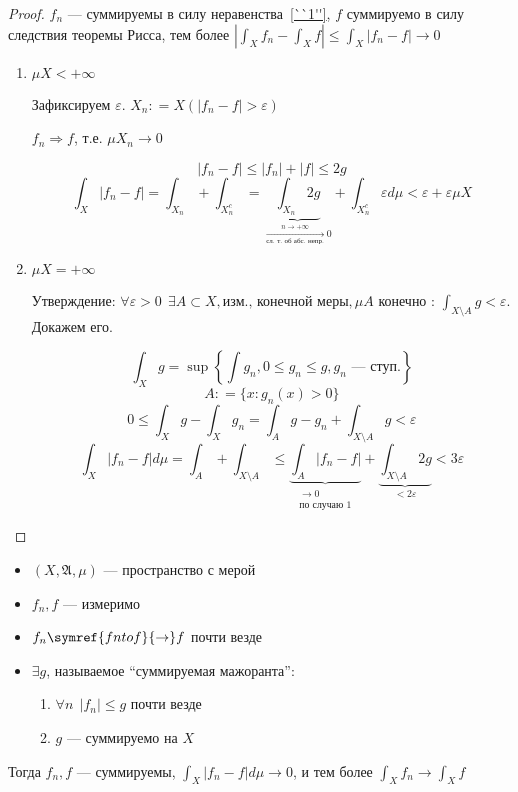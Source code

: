 \begin{proof}
    \(f_n\) --- суммируемы в силу неравенства~\eqref{``1''}, \(f\) суммируемо в силу следствия теоремы Рисса, тем более \(|\int_X f_n - \int_X f| \leq  \int_X |f_n - f| \to 0\)

    \begin{enumerate}
        \item \(\mu X < +\infty\)

              Зафиксируем \(\varepsilon\). \(X_n : = X(|f_n - f| > \varepsilon)\)

              \(f_n \Rightarrow f\), т.е. \(\mu X_n \to 0\)

              \begin{equation}
                  |f_n - f| \leq |f_n| + |f| \leq 2g \label{|f_n - f| < 2g}
              \end{equation}
              \[\int_X |f_n - f| = \int_{X_n} + \int_{X_n^c} = \underbrace{\int_{X_n} 2g}_{\xrightarrow[\text{сл. т. об абс. непр.}]{n \to +\infty} 0} + \int_{X_n^c} \varepsilon d\mu < \varepsilon + \varepsilon \mu X\]

        \item \(\mu X = +\infty\)

              Утверждение: \(\forall \varepsilon > 0 \ \ \exists A \subset X, \text{изм., конечной меры}, \mu A \text{ конечно : } \int_{X\setminus A} g < \varepsilon\). Докажем его.

              \[\int_X g = \sup \left\{\int g_n, 0 \leq g_n \leq g, g_n \text{ --- ступ.}\right\} \]
              \[A : = \{x : g_n(x) > 0\}\]
              \[0 \leq \int_X g - \int_X g_n = \int_A g - g_n + \int_{X\setminus A} g < \varepsilon\]
              \[\int_X |f_n - f| d\mu = \int_A + \int_{X\setminus A} \leq \underbrace{\int_A |f_n - f|}_{\substack{ \to 0 \\ \text{по случаю 1}}} + \underbrace{\int_{X\setminus A} 2g}_{ < 2\varepsilon} < 3 \varepsilon\]
    \end{enumerate}
\end{proof}

\begin{theorem}[Лебега]\itemfix
    \begin{itemize}
        \item \((X, \mathfrak{A}, \mu)\) --- пространство с мерой
        \item \(f_n, f\) --- измеримо
        \item \(f_n \symref{fn to f}{\to} f\) почти везде
        \item \(\exists g\), называемое ``суммируемая мажоранта'':
              \begin{enumerate}
                  \item \(\forall n \ \ |f_n| \leq g\) почти везде
                  \item \(g\) --- суммируемо на \(X\)
              \end{enumerate}
    \end{itemize}

    Тогда \(f_n, f\) --- суммируемы, \(\int_X |f_n - f| d\mu \to 0\), и тем более \(\int_X f_n \to \int_X f\)
\end{theorem}

